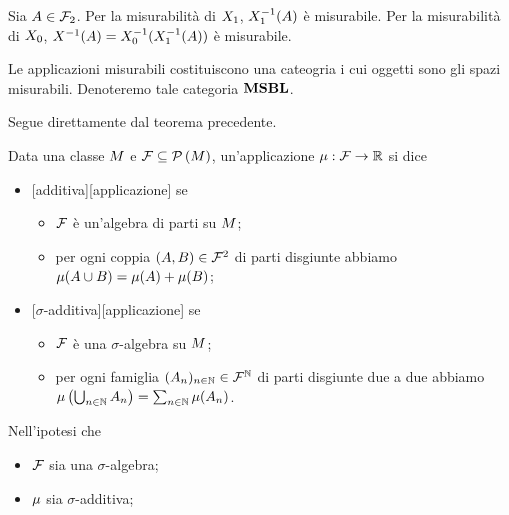 \Proof Sia $A \in \mathcal{F}_2$. Per la misurabilit\`a
di $X_1$, $X_1^{-1}(A)$
\`e misurabile. Per la misurabilit\`a di $X_0$,
$X^{-1}(A) =
X_0^{-1} (X_1^{-1} (A))$
\`e misurabile. \EndProof
\begin{Corollary}
  Le applicazioni misurabili costituiscono una cateogria i cui oggetti sono gli
  spazi misurabili. Denoteremo tale categoria $\mathbf{MSBL}$.
\end{Corollary}
\Proof Segue direttamente dal teorema precedente. \EndProof
\begin{Definition}
  Data una classe $M$ e
  $\mathcal{F}  \subseteq \mathcal{P} \left (M \right )$,
  un'applicazione
  $\mu: \mathcal{F} \rightarrow \mathbb{R}$
  si dice
  \begin{itemize}
    \item {}[additiva][applicazione] se
      \begin{itemize}
        \item $\mathcal{F}$ \`e un'algebra di parti su
          $M$;
        \item per ogni coppia
            $(A,B) \in \mathcal{F}^2$
            di parti disgiunte abbiamo
            $\mu(A \cup B) =
            \mu(A) + \mu(B)$;
      \end{itemize}
    \item {}[$\sigma$-additiva][applicazione] se
      \begin{itemize}
        \item $\mathcal{F}$ \`e una $\sigma$-algebra su
          $M$;
        \item per ogni famiglia
          $(A_n)_{n \in \mathbb{N}} \in \mathcal{F}^\mathbb{N}$
          di parti disgiunte due a due abbiamo
          $\mu \left ( \bigcup_{n \in \mathbb{N}} A_n\right )
            = \sum_{n \in \mathbb{N}} \mu(A_n)$.
      \end{itemize}
  \end{itemize}
  Nell'ipotesi che
  \begin{itemize}
    \item $\mathcal{F}$ sia una $\sigma$-algebra;
    \item $\mu$ sia $\sigma$-additiva;

\end{itemize}
\end{Definition}
